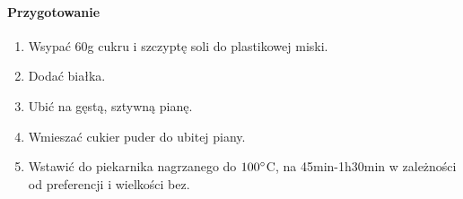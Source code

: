 \documentclass{article}
\begin{document}
    \paragraph{Przygotowanie}
    \begin{enumerate}
        \item Wsypać 60g cukru i szczyptę soli do plastikowej miski.
        \item Dodać białka.
        \item Ubić na gęstą, sztywną pianę.
        \item Wmieszać cukier puder do ubitej piany.
        \item Wstawić do piekarnika nagrzanego do $100\degree$C, na
            45min-1h30min w zależności od preferencji i wielkości bez.
    \end{enumerate}
    \newpage
\end{document}
